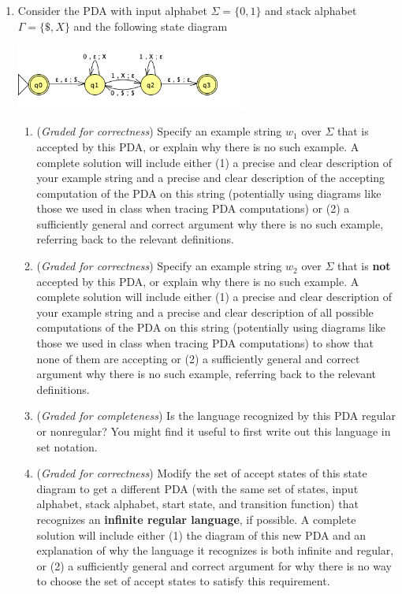 \begin{enumerate}
{\it Bonus; not for credit: extend this homework problem for $TZ(L)$ as well.}

\item Consider the PDA with input
alphabet $\Sigma = \{ 0, 1\}$ and stack alphabet $\Gamma = \{\$, X\}$ 
and the following state diagram

\begin{center}
    \includegraphics[width=3in]{../../resources/machines/hw3PDA.png}
\end{center}

\begin{enumerate}
\item ({\it Graded for correctness}) Specify an example string $w_1$ over $\Sigma$ that is accepted by this PDA, or explain why there is no such 
example. A complete solution will include either (1) a precise and clear 
description of your example  string and a precise and clear description of the accepting computation
of the PDA on this string (potentially using diagrams like those we used in class when tracing PDA
computations) or (2) a sufficiently
general and correct argument why there is no such example, referring back to the relevant definitions.
\item ({\it Graded for correctness}) Specify an example string $w_2$ over $\Sigma$ that is {\bf not} accepted by this PDA, 
or explain why there is no such 
example. A complete solution will include either (1) a precise and clear 
description of your example  string and a precise and clear description of all possible computations
of the PDA on this string (potentially using diagrams like those we used in class when tracing PDA
computations) to show that none of them are accepting or (2) a sufficiently
general and correct argument why there is no such example, referring back to the relevant definitions.
\item ({\it Graded for completeness}) Is the language recognized by this PDA regular or nonregular? You might 
find it useful to first write out this language in set notation.
\item ({\it Graded for correctness}) Modify the set of accept states of this state diagram to get a different PDA
(with the same set of states, input alphabet, stack alphabet, start state, and transition function) 
that recognizes an {\bf infinite  regular language}, if possible. A complete solution will include either (1) the 
diagram of this new PDA and an explanation of why the language it recognizes
is both infinite and regular, or (2) a sufficiently general and correct argument for why there is no way to choose 
the set of accept states to satisfy this requirement.
\end{enumerate}
\end{enumerate}
